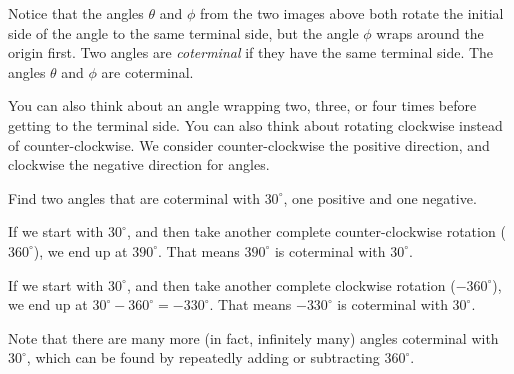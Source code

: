 \documentclass[nooutcomes]{ximera}
\begin{document}
	\begin{image}
	\end{image}

Notice that the angles $\theta$ and $\phi$ from the two images above both rotate the initial side of the angle to the same terminal side, but the angle $\phi$ wraps around the origin first. Two angles are \emph{coterminal} if they have the same terminal side.
The angles $\theta$ and $\phi$ are coterminal. 

You can also think about an angle wrapping two, three, or four times before 
getting to the terminal side. You can also think about rotating clockwise instead of counter-clockwise. We consider counter-clockwise the positive direction, and clockwise the negative direction for angles. 

\begin{example}
	Find two angles that are coterminal with $30^\circ$, one positive and one negative.

	\begin{explanation}

		If we start with $30^\circ$, and then take another complete counter-clockwise rotation ($360^\circ$), we end up at $390^\circ$. That means $390^\circ$ is coterminal with $30^\circ$.

		If we start with $30^\circ$, and then take another complete clockwise rotation ($-360^\circ$), we end up at $30^\circ-360^\circ = -330^\circ$. That means $-330^\circ$ is coterminal with $30^\circ$.

		Note that there are many more (in fact, infinitely many) angles coterminal with $30^\circ$, which can be found by repeatedly adding or subtracting $360^\circ$.
	\end{explanation}
\end{example}
\end{document}
